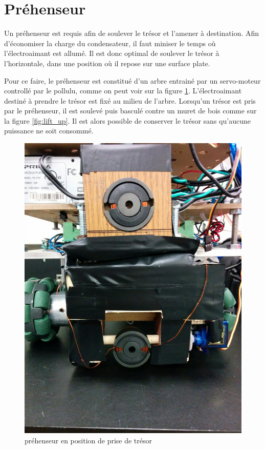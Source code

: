 \section{Préhenseur}

Un préhenseur est requis afin de soulever le trésor et l'amener à destination.
Afin d'économiser la charge du condensateur, il faut miniser le temps où l'électroaimant est allumé.
Il est donc optimal de soulever le trésor à l'horizontale, dans une position où il repose sur une surface plate.

Pour ce faire, le préhenseur est constitué d'un arbre entrainé par un servo-moteur controllé par le pollulu,
comme on peut voir sur la figure \ref{fig:lift_down}.
L'électroaimant destiné à prendre le trésor est fixé au milieu de l'arbre.
Lorsqu'un trésor est pris par le préhenseur, il est soulevé puis basculé contre un muret de bois comme sur la figure \ref{fig:lift_up}.
Il est alors possible de conserver le trésor sans qu'aucune puissance ne soit consommé.

\begin{figure}[ht]
  \centering
  \includegraphics[scale=0.05]{resources/prehenseur_down.jpg}
  \caption{préhenseur en position de prise de trésor}
  \label{fig:lift_down}
\end{figure}

